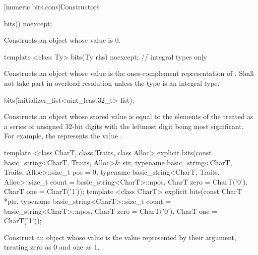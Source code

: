 \begin{addedblock}
[numeric.bits.cons]{Constructors}

\begin{itemdecl}
bits() noexcept;
\end{itemdecl}

\begin{itemdescr}
\effects Constructs an object whose value is 0.
\end{itemdescr}

\begin{itemdecl}
template <class Ty>
  bits(Ty rhs) noexcept;    // integral types only
\end{itemdecl}

\begin{itemdescr}
\effects Constructs an object whose value is the ones-complement representation of . Shall not take part in overload resolution unless the type  is an integral type.
\end{itemdescr}

\begin{itemdecl}
bits(initializer_list<uint_least32_t> list);
\end{itemdecl}

\begin{itemdescr}
\effects Constructs an object whose stored value is equal to the elements of the  treated as a series of unsigned 32-bit digits with the leftmost digit being most significant. For example, the  represents the value .
\end{itemdescr}

\begin{itemdecl}
template <class CharT, class Traits, class Alloc>
  explicit bits(const basic_string<CharT, Traits, Alloc>& str,
                typename basic_string<CharT, Traits, Alloc>::size_t pos = 0,
                typename basic_string<CharT, Traits, Alloc>::size_t count = basic_string<CharT>::npos,
                CharT zero = CharT('0'),
                CharT one = CharT('1'));
template <class CharT>
  explicit bits(const CharT *ptr,
                typename basic_string<CharT>::size_t count = basic_string<CharT>::npos,
                CharT zero = CharT('0'),
                CharT one = CharT('1'));
\end{itemdecl}

\begin{itemdescr}
\effects Construct an object whose value is the value represented by their argument, treating zero as 0 and one as 1.
\end{itemdescr}


\end{addedblock}
